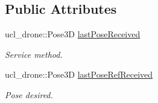 \subsection*{Public Attributes}
\begin{DoxyCompactItemize}
\item 
ucl\+\_\+drone\+::\+Pose3D \hyperlink{classBasicController_aa888b6ee902621dff3d9e551e83b0dcb}{last\+Pose\+Received}
\begin{DoxyCompactList}\small\item\em Service method. \end{DoxyCompactList}\item 
\mbox{\label{classBasicController_a6c591b2116095fb9f394713d8dc7f3e5}} 
ucl\+\_\+drone\+::\+Pose3D \hyperlink{classBasicController_a6c591b2116095fb9f394713d8dc7f3e5}{last\+Pose\+Ref\+Received}
\begin{DoxyCompactList}\small\item\em Pose desired. \end{DoxyCompactList}\end{DoxyCompactItemize}

